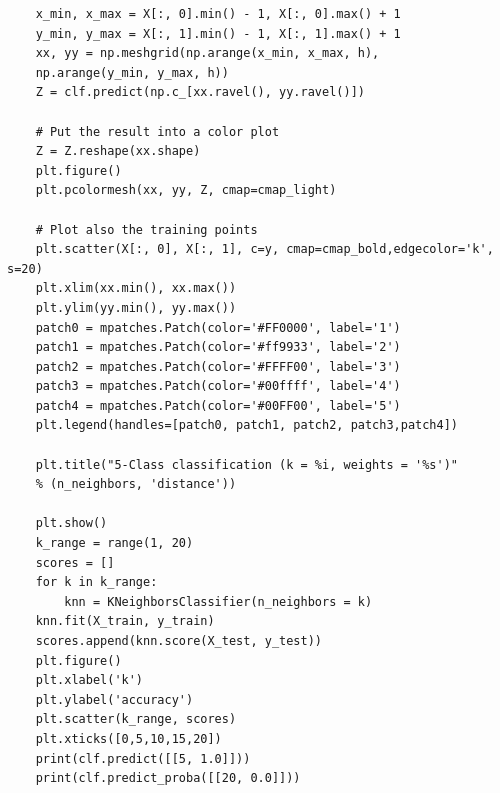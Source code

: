 \documentclass{article}
\begin{document}
\begin{verbatim}
    x_min, x_max = X[:, 0].min() - 1, X[:, 0].max() + 1
    y_min, y_max = X[:, 1].min() - 1, X[:, 1].max() + 1
    xx, yy = np.meshgrid(np.arange(x_min, x_max, h),
    np.arange(y_min, y_max, h))
    Z = clf.predict(np.c_[xx.ravel(), yy.ravel()])
    
    # Put the result into a color plot
    Z = Z.reshape(xx.shape)
    plt.figure()
    plt.pcolormesh(xx, yy, Z, cmap=cmap_light)
    
    # Plot also the training points
    plt.scatter(X[:, 0], X[:, 1], c=y, cmap=cmap_bold,edgecolor='k', s=20)
    plt.xlim(xx.min(), xx.max())
    plt.ylim(yy.min(), yy.max())
    patch0 = mpatches.Patch(color='#FF0000', label='1')
    patch1 = mpatches.Patch(color='#ff9933', label='2')
    patch2 = mpatches.Patch(color='#FFFF00', label='3')
    patch3 = mpatches.Patch(color='#00ffff', label='4')
    patch4 = mpatches.Patch(color='#00FF00', label='5')
    plt.legend(handles=[patch0, patch1, patch2, patch3,patch4])
    
    plt.title("5-Class classification (k = %i, weights = '%s')"
    % (n_neighbors, 'distance'))
    
    plt.show()
    k_range = range(1, 20)
    scores = []
    for k in k_range:
        knn = KNeighborsClassifier(n_neighbors = k)
    knn.fit(X_train, y_train)
    scores.append(knn.score(X_test, y_test))
    plt.figure()
    plt.xlabel('k')
    plt.ylabel('accuracy')
    plt.scatter(k_range, scores)
    plt.xticks([0,5,10,15,20])
    print(clf.predict([[5, 1.0]]))
    print(clf.predict_proba([[20, 0.0]]))
\end{verbatim}
\end{document}
